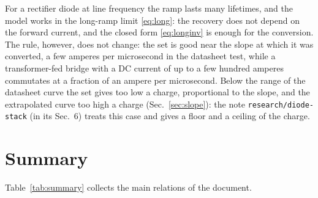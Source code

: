 \documentclass[10pt,a4paper]{scrartcl}
\begin{document}
For a rectifier diode at line frequency the ramp lasts many lifetimes, and the model works in the long-ramp limit \eqref{eq:long}: the recovery does not depend on the forward current, and the closed form \eqref{eq:longinv} is enough for the conversion. The rule, however, does not change: the set is good near the slope at which it was converted, a few amperes per microsecond in the datasheet test, while a transformer-fed bridge with a DC current of up to a few hundred amperes commutates at a fraction of an ampere per microsecond. Below the range of the datasheet curve the set gives too low a charge, proportional to the slope, and the extrapolated curve too high a charge (Sec.~\ref{sec:slope}): the note \texttt{research/diode-stack} (in its Sec.~6) treats this case and gives a floor and a ceiling of the charge.

\section{Summary}
\label{sec:summary}
Table~\ref{tab:summary} collects the main relations of the document.
\end{document}
